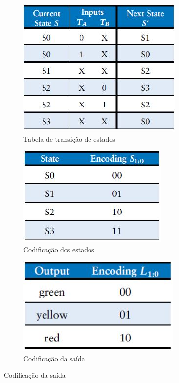 \documentclass[a4paper]{article}
\begin{document}
\begin{figure}[H]
\centering
\begin{subfigure}{.3\textwidth}
	\centering
    \includegraphics[width=.8\linewidth]{images/tabela_de_transicao_de_estados.jpg}
    \caption*{Tabela de transição de estados}
\end{subfigure}%
\begin{subfigure}{.3\textwidth}
	\centering
    \includegraphics[width=.8\linewidth]{images/codificacao_de_estados.jpg}
    \caption*{Codificação dos estados}
\end{subfigure}%
\begin{subfigure}{.3\textwidth}
	\centering
    \includegraphics[width=.8\linewidth]{images/codificacao_de_saidas.jpg}
    \caption*{Codificação da saída}
\end{subfigure}
\end{figure}
\end{document}
